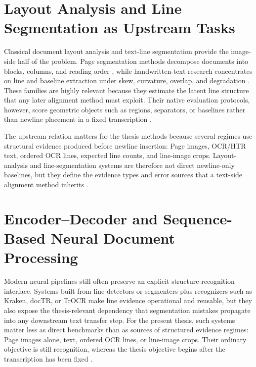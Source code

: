 \section{Layout Analysis and Line Segmentation as Upstream Tasks}
\label{sec:sota_layout_upstream}

Classical document layout analysis and text-line segmentation provide the image-side half of the problem. Page segmentation methods decompose documents into blocks, columns, and reading order , while handwritten-text research concentrates on line and baseline extraction under skew, curvature, overlap, and degradation . These families are highly relevant because they estimate the latent line structure that any later alignment method must exploit. Their native evaluation protocols, however, score geometric objects such as regions, separators, or baselines rather than newline placement in a fixed transcription .

The upstream relation matters for the thesis methods because several regimes use structural evidence produced before newline insertion: Page images, OCR/HTR text, ordered OCR lines, expected line counts, and line-image crops. Layout-analysis and line-segmentation systems are therefore not direct newline-only baselines, but they define the evidence types and error sources that a text-side alignment method inherits .

\section{Encoder--Decoder and Sequence-Based Neural Document Processing}
\label{sec:sota_sequence_neural}

Modern neural pipelines still often preserve an explicit structure-recognition interface. Systems built from line detectors or segmenters plus recognizers such as Kraken, docTR, or TrOCR make line evidence operational and reusable, but they also expose the thesis-relevant dependency that segmentation mistakes propagate into any downstream text transfer step. For the present thesis, such systems matter less as direct benchmarks than as sources of structured evidence regimes: Page images alone, \OCRHTR text, ordered OCR lines, or line-image crops. Their ordinary objective is still recognition, whereas the thesis objective begins after the transcription has been fixed .

